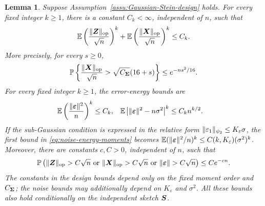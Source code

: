 \documentclass{article}
\theoremstyle{plain} %
\newtheorem{lemma}[theorem]{Lemma}
\theoremstyle{definition} %
\theoremstyle{definition} %
\begin{document}
\begin{lemma}
\label{lem:opnorm-X-bound}
Suppose Assumption~\ref{assu:Gaussian-Stein-design} holds.
For every fixed integer $k\geq1$, there is a constant $C_k<\infty$,
independent of $n$, such that
\begin{align}
    {\mathbb{E}}\left(\frac{\lVert\boldsymbol{Z}\rVert_{\rm op}}{\sqrt n}\right)^k
    +{\mathbb{E}}\left(\frac{\lVert\boldsymbol{X}\rVert_{\rm op}}{\sqrt n}\right)^k
    \leq C_k.
    \label{eq:opnorm-XZ-moments}
\end{align}
More precisely, for every $s\geq0$,
\begin{align}
    {\mathbb{P}}\left\{
       \frac{\lVert\boldsymbol{X}\rVert_{\rm op}}{\sqrt n}
       >\sqrt{C_{\boldsymbol{\Sigma}}}(16+s)
    \right\}
    \leq e^{-ns^2/16}.
    \label{eq:opnorm-X-tail}
\end{align}
For every fixed integer $k\geq1$, the error-energy bounds are
\begin{align}
    {\mathbb{E}}\left(\frac{\lVert{\boldsymbol{\varepsilon} }\rVert^2}{n}\right)^k
       &\leq C_k,
    &
    {\mathbb{E}}\left|\lVert{\boldsymbol{\varepsilon} }\rVert^2-n\sigma^2\right|^k
       &\leq C_kn^{k/2}.
    \label{eq:noise-energy-moments}
\end{align}
If the sub-Gaussian condition is expressed in the relative form
$\lVert\varepsilon_1\rVert_{\psi_2}\leq K_\varepsilon\sigma$, the first bound in
\eqref{eq:noise-energy-moments} becomes
${\mathbb{E}}(\lVert{\boldsymbol{\varepsilon} }\rVert^2/n)^k\leq C(k,K_\varepsilon)(\sigma^2)^k$.
Moreover, there are constants $c,C>0$,
independent of $n$, such that
\begin{align}
    {\mathbb{P}}\left(
       \lVert\boldsymbol{Z}\rVert_{\rm op}>C\sqrt n
       \ \text{or}\
       \lVert\boldsymbol{X}\rVert_{\rm op}>C\sqrt n
       \ \text{or}\
       \lVert{\boldsymbol{\varepsilon} }\rVert>C\sqrt n
    \right)
    \leq Ce^{-cn}.
    \label{eq:design-noise-tail}
\end{align}
The constants in the design bounds depend only on the fixed moment order and
$C_{\boldsymbol{\Sigma}}$; the noise bounds may additionally depend on
$K_\varepsilon$ and $\sigma^2$.
All these bounds also hold conditionally on the independent sketch $\boldsymbol{S}$.
\end{lemma}
\end{document}
